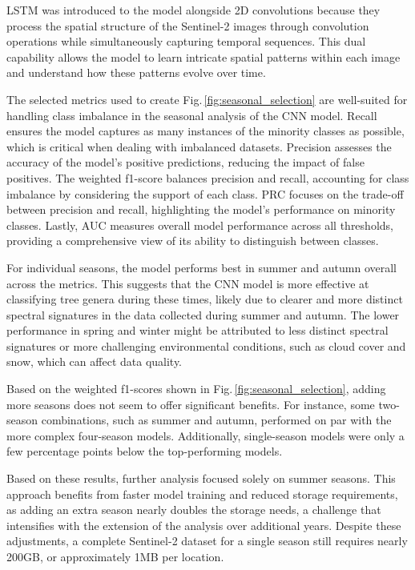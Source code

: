LSTM was introduced to the model alongside 2D convolutions because they process the spatial structure of the Sentinel-2 images through convolution operations while simultaneously capturing temporal sequences. This dual capability allows the model to learn intricate spatial patterns within each image and understand how these patterns evolve over time.

The selected metrics used to create Fig.\,\ref{fig:seasonal_selection} are well-suited for handling class imbalance in the seasonal analysis of the CNN model. Recall ensures the model captures as many instances of the minority classes as possible, which is critical when dealing with imbalanced datasets. Precision assesses the accuracy of the model's positive predictions, reducing the impact of false positives. The weighted f1-score balances precision and recall, accounting for class imbalance by considering the support of each class. PRC focuses on the trade-off between precision and recall, highlighting the model's performance on minority classes. Lastly, AUC measures overall model performance across all thresholds, providing a comprehensive view of its ability to distinguish between classes.

For individual seasons, the model performs best in summer and autumn overall across the metrics. This suggests that the CNN model is more effective at classifying tree genera during these times, likely due to clearer and more distinct spectral signatures in the data collected during summer and autumn. The lower performance in spring and winter might be attributed to less distinct spectral signatures or more challenging environmental conditions, such as cloud cover and snow, which can affect data quality.

Based on the weighted f1-scores shown in Fig.\,\ref{fig:seasonal_selection}, adding more seasons does not seem to offer significant benefits. For instance, some two-season combinations, such as summer and autumn, performed on par with the more complex four-season models. Additionally, single-season models were only a few percentage points below the top-performing models.

Based on these results, further analysis focused solely on summer seasons. This approach benefits from faster model training and reduced storage requirements, as adding an extra season nearly doubles the storage needs, a challenge that intensifies with the extension of the analysis over additional years. Despite these adjustments, a complete Sentinel-2 dataset for a single season still requires nearly 200GB, or approximately  1MB per location.

